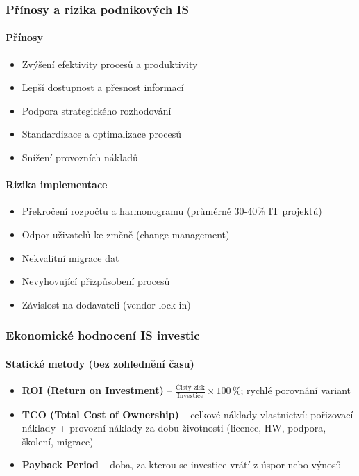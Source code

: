 \subsubsection{Přínosy a rizika podnikových IS}

\paragraph{Přínosy}
\begin{itemize}
  \item Zvýšení efektivity procesů a produktivity
  \item Lepší dostupnost a přesnost informací
  \item Podpora strategického rozhodování
  \item Standardizace a optimalizace procesů
  \item Snížení provozních nákladů
\end{itemize}

\paragraph{Rizika implementace}
\begin{itemize}
  \item Překročení rozpočtu a harmonogramu (průměrně 30-40\% IT projektů)
  \item Odpor uživatelů ke změně (change management)
  \item Nekvalitní migrace dat
  \item Nevyhovující přizpůsobení procesů
  \item Závislost na dodavateli (vendor lock-in)
\end{itemize}

\subsubsection{Ekonomické hodnocení IS investic}

\paragraph{Statické metody (bez zohlednění času)}
\begin{itemize}
  \item \textbf{ROI (Return on Investment)} -- $\frac{\text{Čistý zisk}}{\text{Investice}} \times 100\,\%$;
    rychlé porovnání variant
  \item \textbf{TCO (Total Cost of Ownership)} -- celkové náklady vlastnictví: pořizovací náklady + provozní
    náklady za dobu životnosti (licence, HW, podpora, školení, migrace)
  \item \textbf{Payback Period} -- doba, za kterou se investice vrátí z úspor nebo výnosů
\end{itemize}

